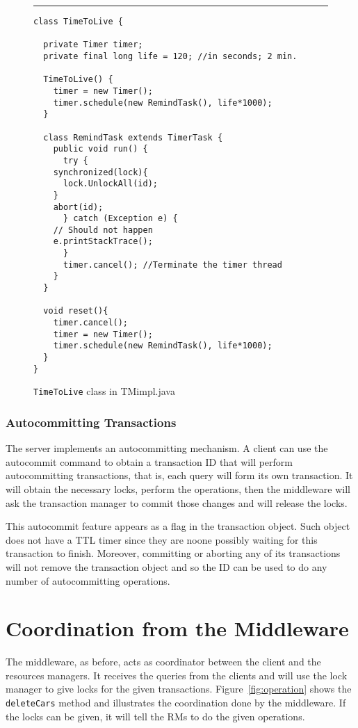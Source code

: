 \documentclass[12pt]{article}
\theoremstyle{plain}%
\theoremstyle{definition}
\theoremstyle{remark}
\newcommand{\java}[1]{{\lstinline!#1!}}
\newenvironment{figureone}[1]{%
  \def\deffigurecaption{#1}%
  \begin{figure}[htbp]%
  \begin{center}%
  \begin{minipage}{\columnwidth}%
  \hrule \vspace*{2ex}%
}{%
  \end{minipage}%
  \end{center}%
  \caption{\deffigurecaption}%
  \end{figure}%
}
\begin{document}
\begin{figureone}{\java{TimeToLive} class in TMimpl.java \label{fig:ttl}}
\begin{lstlisting}
class TimeToLive {

  private Timer timer;
  private final long life = 120; //in seconds; 2 min.
  
  TimeToLive() {
    timer = new Timer();
    timer.schedule(new RemindTask(), life*1000);
  }
  
  class RemindTask extends TimerTask {
    public void run() {
      try {
	synchronized(lock){
	  lock.UnlockAll(id);
	}
	abort(id);
      } catch (Exception e) {
	// Should not happen
	e.printStackTrace();
      }
      timer.cancel(); //Terminate the timer thread
    }
  }	
  
  void reset(){
    timer.cancel();
    timer = new Timer();
    timer.schedule(new RemindTask(), life*1000);
  }
}
\end{lstlisting}
\end{figureone}


\subsubsection{Autocommitting Transactions}

The server implements an autocommitting mechanism. A client can use the autocommit command to obtain a transaction ID that will perform autocommitting transactions, that is, each query will form its own transaction. It will obtain the necessary locks, perform the operations, then the middleware will ask the transaction manager to commit those changes and will release the locks. 

This autocommit feature appears as a flag in the transaction object. Such object does not have a TTL timer since they are noone possibly waiting for this transaction to finish. Moreover, committing or aborting any of its transactions will not remove the transaction object and so the ID can be used to do any number of autocommitting operations.  

\section{Coordination from the Middleware}

The middleware, as before, acts as coordinator between the client and the resources managers. It receives the queries from the clients and will use the lock manager to give locks for the given transactions. Figure~\ref{fig:operation} shows the \java{deleteCars} method and illustrates the coordination done by the middleware. If the locks can be given, it will tell the RMs to do the given operations. 
\end{document}
